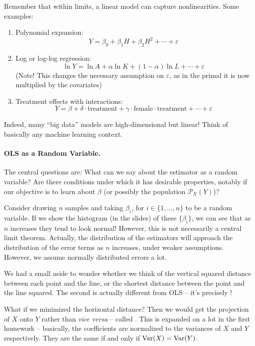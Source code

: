 \documentclass[10pt]{article}
\begin{document}
\begin{remark}
	Remember that within limits, a linear model can capture nonlinearities. Some examples: \begin{enumerate}
		\item Polynomial expansion: \[Y = \beta_0 + \beta_1 H + \beta_2 H^2 + \cdots + \varepsilon \]
		\item Log or log-log regression: \[\ln Y = \ln A + \alpha \ln K + (1-\alpha) \ln L + \cdots + \varepsilon\] (Note! This changes the necessary assumption on $\varepsilon$, as in the primal it is now multiplied by the covariates)
		\item Treatment effects with interactions: \[Y = \beta + \delta \cdot \text{treatment} + \gamma \cdot \text{female} \cdot \text{treatment} + \cdots + \varepsilon\]
	\end{enumerate}
	Indeed, many ``big data'' models are high-dimensional but linear! Think of basically any machine learning context.
\end{remark}

\paragraph{OLS as a Random Variable.}

The central questions are: What can we say about the estimator as a random variable? Are there conditions under which it has desirable properties, notably if our objective is to learn about $\beta$ (or possibly the population $\mathcal{P}_X(Y)$)?

Consider drawing $n$ samples and taking $\beta_i$, for $i \in \{1,\dots,n\}$ to be a random variable. If we show the histogram (in the slides) of these $\{\beta_i\}$, we can see that as $n$ increases they tend to look normal! However, this is not necessarily a central limit theorem. Actually, the distribution of the estimators will approach the distribution of the error terms as $n$ increases, under weaker assumptions. However, we assume normally distributed errors a lot.

\begin{remark}
	We had a small aside to wonder whether we think of the vertical squared distance between each point and the line, or the shortest distance between the point and the line squared. The second is actually different from OLS -- it's precisely !
\end{remark}

\begin{remark}
	What if we minimized the horizontal distance? Then we would get the projection of $X$ onto $Y$ rather than \emph{vice versa} -- called . This is expanded on a lot in the first homework -- basically, the coefficients are normalized to the variances of $X$ and $Y$ respectively. They are the same if and only if $\mathop{\rm Var}(X) = \mathop{\rm Var}(Y)$. 
\end{remark}
\end{document}
